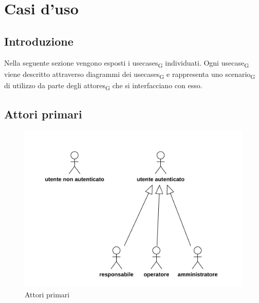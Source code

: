 \section{Casi d'uso}
\subsection{Introduzione}
Nella seguente sezione vengono esposti i \glspl{usecase}\textsubscript{G} individuati. Ogni \gls{usecase}\textsubscript{G} viene descritto attraverso diagrammi dei \glspl{usecase}\textsubscript{G} e rappresenta uno \gls{scenario}\textsubscript{G} di utilizzo da parte degli \glspl{attore}\textsubscript{G} che si interfacciano con esso.
\subsection{Attori primari}
\begin{figure}[H]
	\centering
	\includegraphics[scale=0.52]{res/images/gerarchia.png}
	\caption{Attori primari}
\end{figure}
